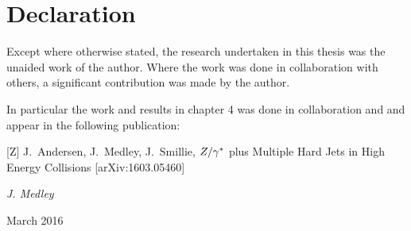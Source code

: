 \chapter*{Declaration}

\normalsize
Except where otherwise stated, the research undertaken in this thesis
was the unaided work of the author. Where the work was done in collaboration
with others, a significant contribution was made by the author.

In particular the work and results in chapter 4 was done in collaboration
and and appear in the following publication:

[Z] J.~Andersen, J.~Medley, J.~Smillie, $Z/\gamma^*$ plus Multiple Hard Jets
in High Energy Collisions [arXiv:1603.05460]

\vspace{20mm}
\hfill {\it J. Medley}

\hfill March 2016


